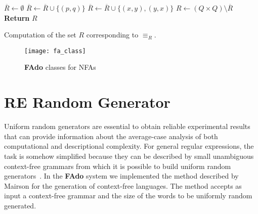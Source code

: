 \documentclass{llncs}
\newcommand{\FAdo}{{\bf FAdo}\xspace}
\newcommand{\nfas}{NFAs\xspace}
\newcommand{\re}{RE\xspace}
\newcommand{\Alphabet}{\Sigma}
\newcommand{\letter}{\sigma}
\begin{document}
{\small \vspace{-0.3cm}\begin{algorithm}[H]
 \begin{algorithmic}[]
    \STATE $\overline{R} \leftarrow \emptyset$
    \STATE $\overline{R} \leftarrow \overline{R} \cup \{(p,q)\}$
    \ENDIF
    \ENDFOR
    \WHILE{$\exists (x,y) \not\in \overline{R} \colon \exists{\letter\in\Alphabet}\colon\exists{
      z\in\delta(x,\letter)}\colon\forall{w \in\delta(y, \letter)}\colon z
      \overline{R} w$}
    \STATE $\overline{R} \leftarrow \overline{R} \cup \{(x,y),(y,x)\}$
    \ENDWHILE
    \STATE $R \leftarrow (Q\times Q)\setminus \overline{R}$
    \STATE \textbf{Return} $R$
  \end{algorithmic}
  \caption{Computation of the set $R$ corresponding to $\equiv_R$.}\label{alg:equiv}
\end{algorithm}}

\begin{figure}
\begin{center}
  \texttt{[image: fa\_class]}
\end{center}
\caption{\FAdo classes for \nfas}
\label{fig:faclass}
\vspace{-1cm}
\end{figure}
\section{\re Random Generator}
\label{sec:radom}
Uniform random generators are essential to obtain reliable
experimental results that can provide information about the
average-case analysis of both computational and descriptional
complexity.  For general regular expressions, the task is somehow
simplified because they can be described by small unambiguous
context-free grammars from which it is possible to build uniform
random
generators~\cite{mairson94:_gener}. In the \FAdo system we implemented the method described by Mairson
\cite{mairson94:_gener} for the generation of context-free
languages. The method accepts as input a context-free grammar and the
size of the words to be uniformly random generated.
\end{document}

